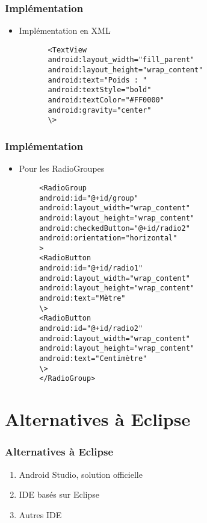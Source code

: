 \documentclass{beamer}
\begin{document}
\begin{frame}[containsverbatim]
  \frametitle{Implémentation}
    \begin{itemize}
        \item Implémentation en XML
    \end{itemize}
    \begin{small}
        \begin{verbatim}
          <TextView
          android:layout_width="fill_parent"
          android:layout_height="wrap_content" 
          android:text="Poids : "
          android:textStyle="bold"
          android:textColor="#FF0000"
          android:gravity="center"
   	      \>
        \end{verbatim}
        \end{small}
\end{frame}


\begin{frame}[containsverbatim]
  \frametitle{Implémentation}
    \begin{itemize}
        \item Pour les RadioGroupes
    \end{itemize}
    \begin{tiny}
         \begin{verbatim}
        <RadioGroup
        android:id="@+id/group"
        android:layout_width="wrap_content"
        android:layout_height="wrap_content"
        android:checkedButton="@+id/radio2"
        android:orientation="horizontal"
        >
        <RadioButton 
        android:id="@+id/radio1"
        android:layout_width="wrap_content"
        android:layout_height="wrap_content"
        android:text="Mètre"
     	\>
        <RadioButton 
        android:id="@+id/radio2"
        android:layout_width="wrap_content"
        android:layout_height="wrap_content"
        android:text="Centimètre"
     	\>
        </RadioGroup>
  \end{verbatim}
  \end{tiny}
\end{frame}




\section{Alternatives à Eclipse}

\begin{frame}
  \frametitle{Alternatives à Eclipse}
  \begin{enumerate}
    \item Android Studio, solution officielle
    \item IDE basés sur Eclipse
    \item Autres IDE
  \end{enumerate}
\end{frame}
\end{document}

